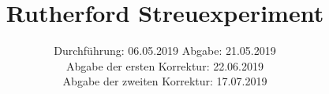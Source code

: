

\subject{V16}
\title{Rutherford Streuexperiment}
\date{%
  Durchführung: 06.05.2019
  \hspace{3em}
  Abgabe: 21.05.2019 \\
  Abgabe der ersten Korrektur: 22.06.2019 \\
  Abgabe der zweiten Korrektur: 17.07.2019
}



\maketitle
\thispagestyle{empty}
\tableofcontents
\newpage





\printbibliography{}



